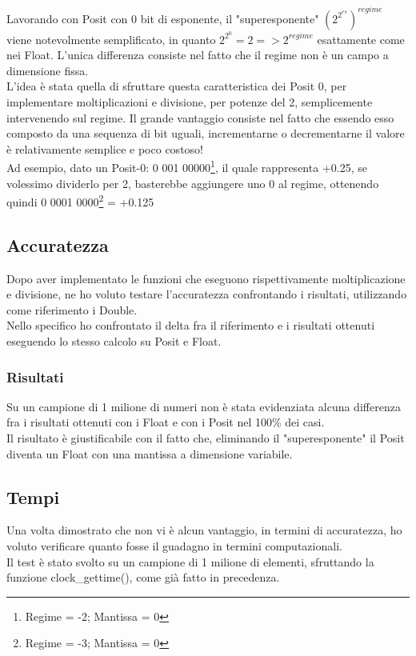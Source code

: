 \documentclass[a4paper,11pt]{article}
\begin{document}
Lavorando con Posit con 0 bit di esponente, il "superesponente" $(2^{2^{es}})^{regime}$ viene notevolmente semplificato, in quanto $2^{2^{0}} = 2 => 2^{regime} $ esattamente come nei Float. L'unica differenza consiste nel fatto che il regime non è un campo a dimensione fissa.\\ L'idea è stata quella di sfruttare questa caratteristica dei Posit 0, per implementare moltiplicazioni e divisione, per potenze del 2, semplicemente intervenendo sul regime. Il grande vantaggio consiste nel fatto che essendo esso composto da una sequenza di bit uguali, incrementarne o decrementarne il valore è relativamente semplice e poco costoso!\\
Ad esempio, dato un Posit-0: 0 001 00000\footnote{Regime = -2; Mantissa = 0}, il quale rappresenta +0.25, se volessimo dividerlo per 2, basterebbe aggiungere uno 0 al regime, ottenendo quindi 0 0001 0000\footnote{Regime = -3; Mantissa = 0} = +0.125

\subsection{Accuratezza}

Dopo aver implementato le funzioni che eseguono rispettivamente moltiplicazione e divisione, ne ho voluto testare l'accuratezza confrontando i risultati, utilizzando come riferimento i Double. \\
Nello specifico ho confrontato il delta fra il riferimento e i risultati ottenuti eseguendo lo stesso calcolo su Posit e Float.

\subsubsection{Risultati} 

Su un campione di 1 milione di numeri non è stata evidenziata alcuna differenza fra i risultati ottenuti con i Float e con i Posit nel 100\% dei casi.\\
Il risultato è giustificabile con il fatto che, eliminando il "superesponente" il Posit diventa un Float con una mantissa a dimensione variabile.

\subsection{Tempi}
Una volta dimostrato che non vi è alcun vantaggio, in termini di accuratezza, ho voluto verificare quanto fosse il guadagno in termini computazionali.\\
Il test è stato svolto su un campione di 1 milione di elementi, sfruttando la funzione clock\_gettime(), come già fatto in precedenza.
\end{document}
